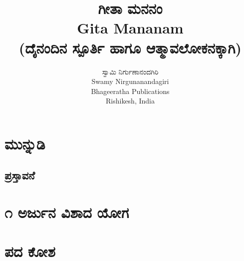 \documentclass[12pt,twoside,openright,a5paper]{book}
\title{\Huge \kanfont \textbf{ಗೀತಾ ಮನನಂ}\\
{\normalsize Gita Mananam\\}
{\small(ದೈನಂದಿನ ಸ್ಪೂರ್ತಿ ಹಾಗೂ ಆತ್ಮಾವಲೋಕನಕ್ಕಾಗಿ)}}
\author{\large \kanfont ಸ್ವಾಮಿ ನಿರ್ಗುಣಾನಂದಗಿರಿ\\
{\normalsize Swamy Nirgunanandagiri}\\
\vspace{15mm}
{\normalsize Bhageeratha Publications}\\
{Rishikesh, India}
}
\date{} %
\begin{document}




\thispagestyle{empty}
\frontmatter

\doublespacing
\tableofcontents
\singlespacing

\thispagestyle{empty}
\thispagestyle{empty}
\pagestyle{fancy}


\chapter{\kanfont ಮುನ್ನುಡಿ}

\begin{onehalfspace}
\chapter{\kanfont ಪ್ರಸ್ತಾವನೆ}

\end{onehalfspace}
\mainmatter
%
\chapter{\kanfont ೧ ಅರ್ಜುನ ವಿಶಾದ ಯೋಗ}
%
\makeatletter\@openrightfalse


\chapter{\kanfont ಪದ ಕೋಶ}

\printindex

\end{document}

